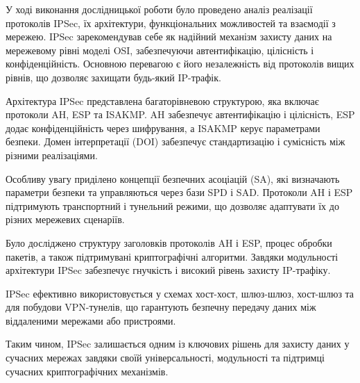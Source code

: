 
У ході виконання дослідницької роботи було проведено аналіз реалізації протоколів IPSec, їх архітектури, функціональних можливостей та взаємодії з мережею. IPSec зарекомендував себе як надійний механізм захисту даних на мережевому рівні моделі OSI, забезпечуючи автентифікацію, цілісність і конфіденційність. Основною перевагою є його незалежність від протоколів вищих рівнів, що дозволяє захищати будь-який IP-трафік.

Архітектура IPSec представлена багаторівневою структурою, яка включає протоколи AH, ESP та ISAKMP. AH забезпечує автентифікацію і цілісність, ESP додає конфіденційність через шифрування, а ISAKMP керує параметрами безпеки. Домен інтерпретації (DOI) забезпечує стандартизацію і сумісність між різними реалізаціями.

Особливу увагу приділено концепції безпечних асоціацій (SA), які визначають параметри безпеки та управляються через бази SPD і SAD. Протоколи AH і ESP підтримують транспортний і тунельний режими, що дозволяє адаптувати їх до різних мережевих сценаріїв.

Було досліджено структуру заголовків протоколів AH і ESP, процес обробки пакетів, а також підтримувані криптографічні алгоритми. Завдяки модульності архітектури IPSec забезпечує гнучкість і високий рівень захисту IP-трафіку.

IPSec ефективно використовується у схемах хост-хост, шлюз-шлюз, хост-шлюз та для побудови VPN-тунелів, що гарантують безпечну передачу даних між віддаленими мережами або пристроями.

Таким чином, IPSec залишається одним із ключових рішень для захисту даних у сучасних мережах завдяки своїй універсальності, модульності та підтримці сучасних криптографічних механізмів.



